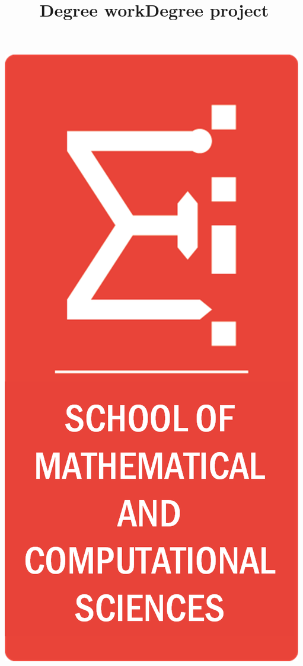 \documentclass[10pt]{article}
\title{Degree work}
\title{Degree project}
\begin{document}

\thispagestyle{firststyle}
\begin{center}
  \begin{minipage}{0.48\textwidth} \begin{flushleft}
    \includegraphics[scale = 0.63]{images/mathlogo}

\end{flushleft}
\end{minipage}
\end{center}
\end{document}
